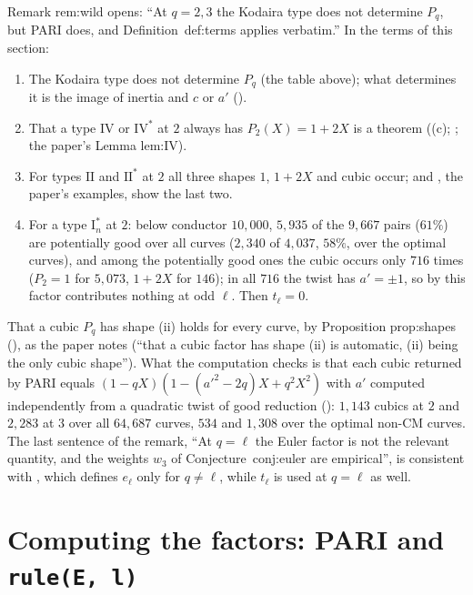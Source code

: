 \begin{remark}\label{rem:lfunctions:wild-status}
Remark rem:wild opens: ``At $q=2,3$ the Kodaira type does not determine $P_q$, but PARI does, and Definition~def:terms applies verbatim.'' In the terms of this section:
\begin{enumerate}[label=(\roman*)]
\item The Kodaira type does not determine $P_q$ (the table above); what determines it is the image of inertia and $c$ or $a'$ ().
\item That a type $\mathrm{IV}$ or $\mathrm{IV}^*$ at $2$ always has $P_2(X)=1+2X$ is a theorem ((c); ; the paper's Lemma lem:IV).
\item For types $\mathrm{II}$ and $\mathrm{II}^*$ at $2$ all three shapes $1$, $1+2X$ and cubic occur;  and , the paper's examples, show the last two.
\item For a type $\mathrm I_n^*$ at $2$: below conductor $10{,}000$, $5{,}935$ of the $9{,}667$ pairs ($61\%$) are potentially good over all curves ($2{,}340$ of $4{,}037$, $58\%$, over
the optimal curves), and among the potentially good ones the cubic occurs only $716$ times ($P_2=1$ for $5{,}073$, $1+2X$ for $146$); in all $716$ the twist has $a'=\pm1$, so by
 this factor contributes nothing at odd $\ell$. Then $t_\ell=0$.
\end{enumerate}
That a cubic $P_q$ has shape (ii) holds for every curve, by Proposition prop:shapes (), as the paper notes (``that a cubic factor has shape (ii) is
automatic, (ii) being the only cubic shape''). What the computation checks is that each cubic returned by PARI equals $(1-qX)(1-(a'^2-2q)X+q^2X^2)$ with $a'$ computed independently
from a quadratic twist of good reduction (): $1{,}143$ cubics at $2$ and $2{,}283$ at $3$ over all $64{,}687$ curves, $534$ and $1{,}308$ over the optimal
non-CM curves. The last sentence of the remark, ``At $q=\ell$ the Euler factor is not the relevant quantity, and the weights $w_3$ of
Conjecture~conj:euler are empirical'', is consistent with , which defines $e_\ell$ only for $q\ne\ell$, while $t_\ell$ is used at $q=\ell$ as well.
\end{remark}

\section{Computing the factors: PARI and \texttt{rule(E, l)}}\label{sec:lfunctions:pari}

